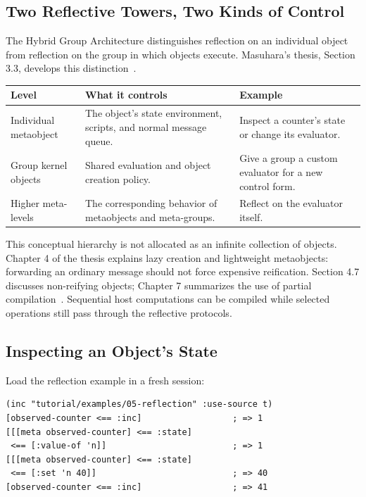 \subsection{Two Reflective Towers, Two Kinds of Control}

The Hybrid Group Architecture distinguishes reflection on an individual
object from reflection on the group in which objects execute.
Masuhara's thesis, Section 3.3, develops this distinction~\cite{masuhara}.

\begin{longtable}{L{0.26\textwidth}L{0.32\textwidth}L{0.32\textwidth}}
\textbf{Level} & \textbf{What it controls} & \textbf{Example}\\\hline
Individual metaobject & The object's state environment, scripts, and
normal message queue. & Inspect a counter's state or change its evaluator.\\
Group kernel objects & Shared evaluation and object creation policy. &
Give a group a custom evaluator for a new control form.\\
Higher meta-levels & The corresponding behavior of metaobjects and
meta-groups. & Reflect on the evaluator itself.\\
\end{longtable}

This conceptual hierarchy is not allocated as an infinite collection
of objects. Chapter 4 of the thesis explains lazy creation and lightweight
metaobjects: forwarding an ordinary message should not force expensive
reification. Section 4.7 discusses non-reifying objects; Chapter 7
summarizes the use of partial compilation~\cite{masuhara}.
Sequential host computations can be compiled while selected operations
still pass through the reflective protocols.

\subsection{Inspecting an Object's State}

Load the reflection example in a fresh session:

\begin{lstlisting}
(inc "tutorial/examples/05-reflection" :use-source t)
[observed-counter <== :inc]                  ; => 1
[[[meta observed-counter] <== :state]
 <== [:value-of 'n]]                         ; => 1
[[[meta observed-counter] <== :state]
 <== [:set 'n 40]]                           ; => 40
[observed-counter <== :inc]                  ; => 41
\end{lstlisting}


